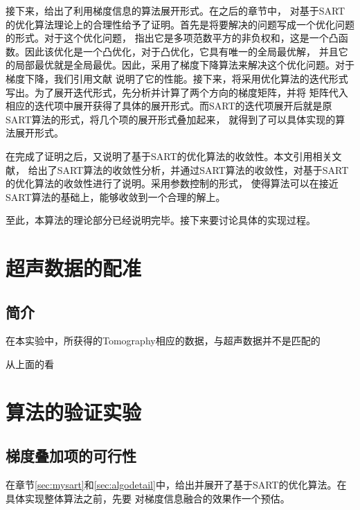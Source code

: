 接下来，给出了利用梯度信息的算法展开形式。在之后的章节中，
对基于SART的优化算法理论上的合理性给予了证明。首先是将要解决的问题写成一个优化问题的形式。对于这个优化问题，
指出它是多项范数平方的非负权和，这是一个凸函数。因此该优化是一个凸优化，对于凸优化，它具有唯一的全局最优解，
并且它的局部最优就是全局最优。因此，采用了梯度下降算法来解决这个优化问题。对于梯度下降，我们引用文献
说明了它的性能。接下来，将采用优化算法的迭代形式写出。为了展开迭代形式，先分析并计算了两个方向的梯度矩阵，并将
矩阵代入相应的迭代项中展开获得了具体的展开形式。而SART的迭代项展开后就是原SART算法的形式，将几个项的展开形式叠加起来，
就得到了可以具体实现的算法展开形式。

在完成了证明之后，又说明了基于SART的优化算法的收敛性。本文引用相关文献，
给出了SART算法的收敛性分析，并通过SART算法的收敛性，对基于SART的优化算法的收敛性进行了说明。采用参数控制的形式，
使得算法可以在接近SART算法的基础上，能够收敛到一个合理的解上。

至此，本算法的理论部分已经说明完毕。接下来要讨论具体的实现过程。


\chapter{超声数据的配准}
\section{简介}
在本实验中，所获得的Tomography相应的数据，与超声数据并不是匹配的

从上面的看

\chapter{算法的验证实验}
\section{梯度叠加项的可行性}
在章节\ref{sec:mysart}和\ref{sec:algodetail}中，给出并展开了基于SART的优化算法。在具体实现整体算法之前，先要
对梯度信息融合的效果作一个预估。

